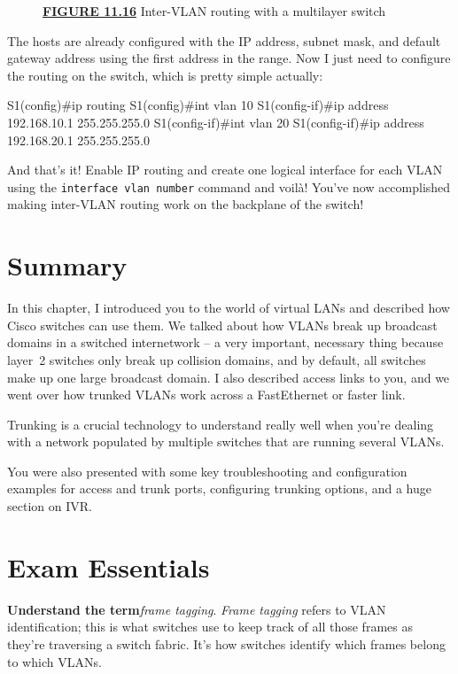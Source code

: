 \begin{figure}
\centering
\caption{{\protect\hyperlink{c11.xhtmlux5cux23figureanchor11-16}{\textbf{FIGURE
11.16}} Inter-VLAN routing with a multilayer switch}}
\end{figure}

The hosts are already configured with the IP address, subnet mask, and
default gateway address using the first address in the range. Now I just
need to configure the routing on the switch, which is pretty simple
actually:

\begin{cli}
S1(config)#ip routing
S1(config)#int vlan 10
S1(config-if)#ip address 192.168.10.1 255.255.255.0
S1(config-if)#int vlan 20
S1(config-if)#ip address 192.168.20.1 255.255.255.0
\end{cli}

And that's it! Enable IP routing and create one logical interface for
each VLAN using the \texttt{interface\ vlan\ number} command and voilà!
You've now accomplished making inter-VLAN routing work on the backplane
of the switch!

\section{Summary}

In this chapter, I introduced you to the world of virtual LANs and
described how Cisco switches can use them. We talked about how VLANs
break up broadcast domains in a switched internetwork -- a very
important, necessary thing because layer~2 switches only break up
collision domains, and by default, all switches make up one large
broadcast domain. I also described access links to you, and we went over
how trunked VLANs work across a FastEthernet or faster link.

Trunking is a crucial technology to understand really well when you're
dealing with a network populated by multiple switches that are running
several VLANs.

You were also presented with some key troubleshooting and configuration
examples for access and trunk ports, configuring trunking options, and a
huge section on IVR.

\section{Exam Essentials}

\textbf{Understand the term}\emph{frame tagging}. \emph{Frame tagging}
refers to VLAN identification; this is what switches use to keep track
of all those frames as they're traversing a switch fabric. It's how
switches identify which frames belong to which VLANs.

